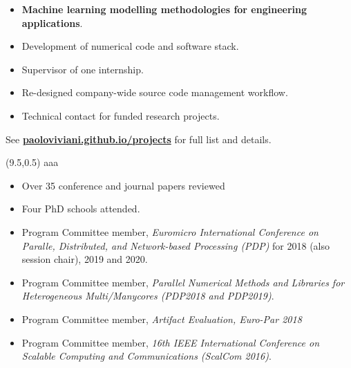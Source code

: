 \documentclass[10pt,a4paper]{altacv}
\begin{document}
\divider

\begin{itemize}
\item \textbf{Machine learning modelling methodologies for engineering applications}.
\item Development of numerical code and software stack.
\item Supervisor of one internship.
\item Re-designed company-wide source code management workflow.
\item Technical contact for funded research projects.
\end{itemize}

\divider

See \href{http://paoloviviani.github.io/projects}{\color{accent}\textbf{paoloviviani.github.io/projects}} for full list and details.
\medskip


\clearpage

\vspace{0.5cm}
\begin{textblock}{10}(9.5,0.5)
  \centering
	aaa
  \vspace{278mm}
\end{textblock}

\renewcommand*{\bibfont}{\small}
\nocite{*}
\medskip
\printbibliography[heading=none]

\divider

\begin{itemize}
\item Over 35 conference and journal papers reviewed
\item Four PhD schools attended.
\item Program Committee member, \textit{Euromicro International Conference on Paralle, Distributed, and Network-based Processing (PDP)} for 2018 (also session chair), 2019 and 2020.
\item Program Committee member, \textit{Parallel Numerical Methods and Libraries for Heterogeneous Multi/Manycores (PDP2018 and PDP2019)}.
\item Program Committee member, \textit{Artifact Evaluation, Euro-Par 2018}
\item Program Committee member, \textit{16th IEEE International Conference on Scalable Computing and Communications (ScalCom 2016)}.
\end{itemize}
\end{document}

